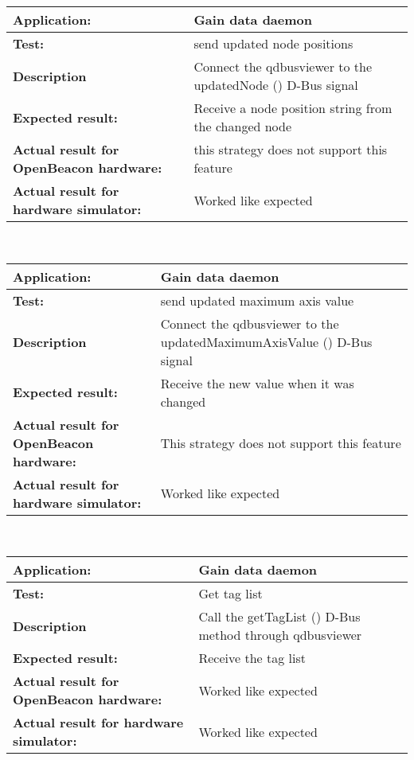    \begin{tabular}{|p{3.5cm}|p{10.5cm}|}
    \hline
     \textbf{Application:}				& Gain data daemon\\
    \hline
     \textbf{Test:}					& send updated node positions\\
    \hline
     \textbf{Description}				& Connect the qdbusviewer to the updatedNode () D-Bus signal\\
    \hline
     \textbf{Expected result:}				& Receive a node position string from the changed node\\
    \hline
     \textbf{Actual result for OpenBeacon hardware:}	& this strategy does not support this feature\\
    \hline
     \textbf{Actual result for hardware simulator:}	& Worked like expected\\
    \hline
   \end{tabular}\\
   \begin{tabular}{|p{3.5cm}|p{10.5cm}|}
    \hline
     \textbf{Application:}				& Gain data daemon\\
    \hline
     \textbf{Test:}					& send updated maximum axis value\\
    \hline
     \textbf{Description}				& Connect the qdbusviewer to the updatedMaximumAxisValue () D-Bus signal\\
    \hline
     \textbf{Expected result:}				& Receive the new value when it was changed\\
    \hline
     \textbf{Actual result for OpenBeacon hardware:}	& This strategy does not support this feature\\
    \hline
     \textbf{Actual result for hardware simulator:}	& Worked like expected\\
    \hline
   \end{tabular}\\
   \begin{tabular}{|p{3.5cm}|p{10.5cm}|}
    \hline
     \textbf{Application:}				& Gain data daemon\\
    \hline
     \textbf{Test:}					& Get tag list\\
    \hline
     \textbf{Description}				& Call the getTagList () D-Bus method through qdbusviewer\\
    \hline
     \textbf{Expected result:}				& Receive the tag list\\
    \hline
     \textbf{Actual result for OpenBeacon hardware:}	& Worked like expected\\
    \hline
     \textbf{Actual result for hardware simulator:}	& Worked like expected\\
    \hline
   \end{tabular}\\
